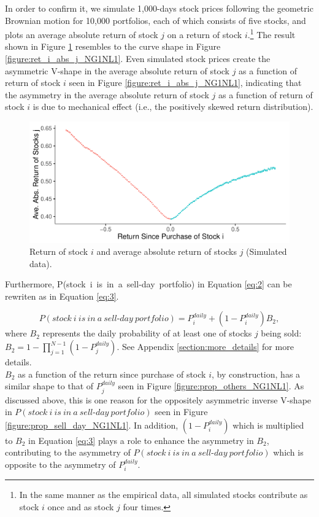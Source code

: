\documentclass[11pt, a4paper]{article}
\begin{document}
In order to confirm it, we simulate 1,000-days stock prices following the geometric Brownian motion for 10,000 portfolios, each of which consists of five stocks, and plots an average absolute return of stock $j$ on a return of stock $i$.\footnote{In the same manner as the empirical data, all simulated stocks contribute as stock $i$ once and as stock $j$ four times.} The result shown in Figure \ref{figure:ret_i_abs_j_sim} resembles to the curve shape in Figure \ref{figure:ret_i_abs_j_NG1NL1}. Even simulated stock prices create the asymmetric V-shape in the average absolute return of stock $j$ as a function of return of stock $i$ seen in Figure \ref{figure:ret_i_abs_j_NG1NL1}, indicating that the asymmetry in the average absolute return of stock $j$ as a function of return of stock $i$ is due to mechanical effect (i.e., the positively skewed return distribution).\\

\begin{figure}[H]
	\centering
	\includegraphics[width=0.8\columnwidth]{sim_R_i_abs_R_j.pdf}
	\caption{Return of stock $i$ and average absolute return of stocks $j$ (Simulated data).}
	\label{figure:ret_i_abs_j_sim}
\end{figure}


Furthermore, P(stock~i~is~in~a~sell\mbox{-}day~portfolio) in Equation \ref{eq:2} can be rewriten as in Equation \ref{eq:3}. 

\begin{equation}
\label{eq:3}
P(stock~i~is~in~a~sell\mbox{-}day~portfolio) = P^{daily}_{i}+(1-P^{daily}_{i})B_2,
\end{equation}
where $B_2$ represents the daily probability of at least one of stocks $j$ being sold: $B_2 = 1-\prod_{j=1}^{N-1}(1-P^{daily}_{j})$. See Appendix \ref{section:more_details} for more details.\\

$B_2$ as a function of the return since purchase of stock $i$, by construction, has a similar shape to that of $P^{daily}_{j}$ seen in Figure \ref{figure:prop_others_NG1NL1}. As discussed above, this is one reason for the oppositely asymmetric inverse V-shape in $P(stock~i~is~in~a~sell\mbox{-}day~portfolio)$ seen in Figure \ref{figure:prop_sell_day_NG1NL1}.
In addition, $(1-P^{daily}_{i})$ which is multiplied to $B_2$ in Equation \ref{eq:3} plays a role to enhance the asymmetry in $B_2$, contributing to the asymmetry of $P(stock~i~is~in~a~sell\mbox{-}day~portfolio)$ which is opposite to the asymmetry of $P^{daily}_{i}$. \\
\end{document}
